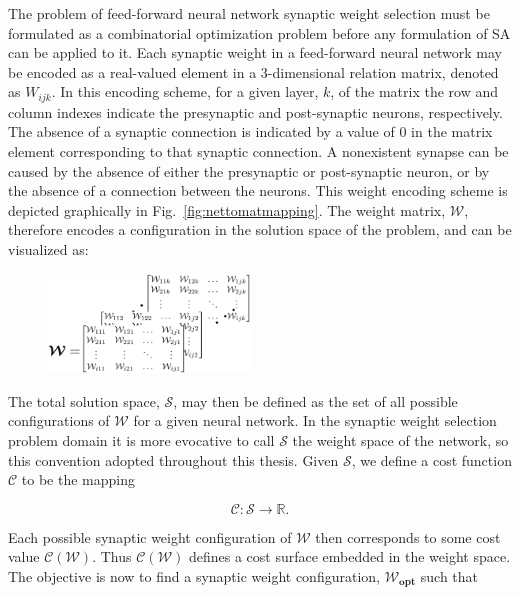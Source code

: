 \documentclass[11pt]{afthesis}
\begin{document}
	 The problem of feed-forward neural network synaptic weight selection must be formulated as a combinatorial optimization problem before any formulation of SA can be applied to it. Each synaptic weight in a feed-forward neural network may be encoded as a real-valued element in a 3-dimensional relation matrix, denoted as $\mathit{W}_{ijk}$. In this encoding scheme, for a given layer, $k$, of the matrix the row and column indexes indicate the presynaptic and post-synaptic neurons, respectively. The absence of a synaptic connection is indicated by a value of $0$ in the matrix element corresponding to that synaptic connection. A nonexistent synapse can be caused by the absence of either the presynaptic or post-synaptic neuron, or by the absence of a connection between the neurons. This weight encoding scheme is depicted graphically in Fig.~\ref{fig:nettomatmapping}. The weight matrix, $\boldsymbol{\mathcal{W}}$, therefore encodes a configuration in the solution space of the problem, and can be visualized as:
	 
	 \begin{figure}[ht!]
	 	\begin{center}
	 		\includegraphics[width = 2.1in]{figures/abstract_matrix_rep.eps}
	 		\label{fig:abstract_matrix_rep}
	 	\end{center}
	 \end{figure}
	 
	 \noindent The total solution space, $\boldsymbol{\mathcal{S}}$, may then be defined as the set of all possible configurations of $\boldsymbol{\mathcal{W}}$ for a given neural network. In the synaptic weight selection problem domain it is more evocative to call $\boldsymbol{\mathcal{S}}$ the weight space of the network, so this convention adopted throughout this thesis. Given $\boldsymbol{\mathcal{S}}$, we define a cost function $ \mathcal{C}$ to be the mapping
	 
	 \begin{equation*} \label{eq:cost_mapping_ffnn}
	 \mathcal{C} : \boldsymbol{\mathcal{S}} \rightarrow \mathbb{R}.
	 \end{equation*}
	 
	 
	 Each possible synaptic weight configuration of $\boldsymbol{\mathcal{W}}$ then corresponds to some cost value $\mathcal{C}(\boldsymbol{\mathcal{W}})$. Thus $\mathcal{C}(\boldsymbol{\mathcal{W}})$ defines a cost surface embedded in the weight space. The objective is now to find a synaptic weight configuration, $\boldsymbol{\mathcal{W}_{opt}}$ such that 
	 
\end{document}
